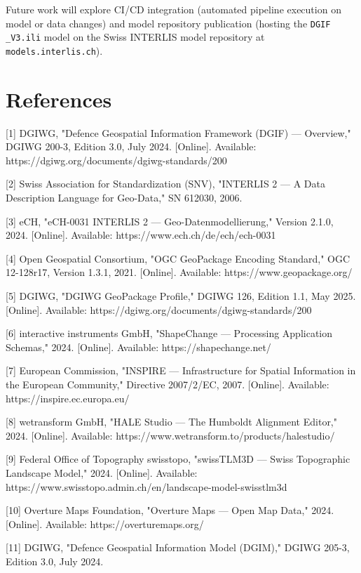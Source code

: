 \documentclass[conference]{IEEEtran}
\begin{document}
Future work will explore CI/CD integration (automated pipeline execution on model or data changes) and model repository publication (hosting the \texttt{DGIF\\_V3.ili} model on the Swiss INTERLIS model repository at \texttt{models.interlis.ch}).



\section*{References}

[1] DGIWG, "Defence Geospatial Information Framework (DGIF) — Overview," DGIWG 200-3, Edition 3.0, July 2024. [Online]. Available: https://dgiwg.org/documents/dgiwg-standards/200

[2] Swiss Association for Standardization (SNV), "INTERLIS 2 — A Data Description Language for Geo-Data," SN 612030, 2006.

[3] eCH, "eCH-0031 INTERLIS 2 — Geo-Datenmodellierung," Version 2.1.0, 2024. [Online]. Available: https://www.ech.ch/de/ech/ech-0031

[4] Open Geospatial Consortium, "OGC GeoPackage Encoding Standard," OGC 12-128r17, Version 1.3.1, 2021. [Online]. Available: https://www.geopackage.org/

[5] DGIWG, "DGIWG GeoPackage Profile," DGIWG 126, Edition 1.1, May 2025. [Online]. Available: https://dgiwg.org/documents/dgiwg-standards/200

[6] interactive instruments GmbH, "ShapeChange — Processing Application Schemas," 2024. [Online]. Available: https://shapechange.net/

[7] European Commission, "INSPIRE — Infrastructure for Spatial Information in the European Community," Directive 2007/2/EC, 2007. [Online]. Available: https://inspire.ec.europa.eu/

[8] wetransform GmbH, "HALE Studio — The Humboldt Alignment Editor," 2024. [Online]. Available: https://www.wetransform.to/products/halestudio/

[9] Federal Office of Topography swisstopo, "swissTLM3D — Swiss Topographic Landscape Model," 2024. [Online]. Available: https://www.swisstopo.admin.ch/en/landscape-model-swisstlm3d

[10] Overture Maps Foundation, "Overture Maps — Open Map Data," 2024. [Online]. Available: https://overturemaps.org/

[11] DGIWG, "Defence Geospatial Information Model (DGIM)," DGIWG 205-3, Edition 3.0, July 2024.
\end{document}
